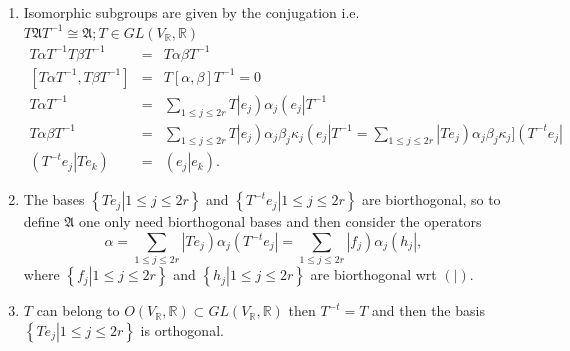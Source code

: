 \documentclass[aps,preprint]{revtex4}
\begin{document}
\begin{enumerate}
\item Isomorphic subgroups are given by the conjugation i.e. $T\mathfrak{A}%
T^{-1}\cong \mathfrak{A;}T\in GL\left( V_{\mathbb{R}},\mathbb{R}\right) $ 
\begin{eqnarray}
T\alpha T^{-1}T\beta T^{-1} &=&T\alpha \beta T^{-1} \\
\left[ T\alpha T^{-1},T\beta T^{-1}\right] &=&T\left[ \alpha ,\beta \right]
T^{-1}=0 \\
T\alpha T^{-1} &=&\sum_{1\leq j\leq 2r}T\left\vert e_{j}\right) \alpha
_{j}\left( e_{j}\right\vert T^{-1} \\
T\alpha \beta T^{-1} &=&\sum_{1\leq j\leq 2r}T\left\vert e_{j}\right) \alpha
_{j}\beta _{j}\kappa _{j}\left( e_{j}\right\vert T^{-1}=\sum_{1\leq j\leq
2r}\left\vert Te_{j}\right) \alpha _{j}\beta _{j}\kappa _{j}]\left(
T^{-t}e_{j}\right\vert \\
\left( \left. T^{-t}e_{j}\right\vert Te_{k}\right) &=&\left( \left.
e_{j}\right\vert e_{k}\right) .
\end{eqnarray}

\item The bases $\left\{ \left. Te_{j}\right\vert 1\leq j\leq 2r\right\} $
and $\left\{ \left. T^{-t}e_{j}\right\vert 1\leq j\leq 2r\right\} $ are
biorthogonal, so to define $\mathfrak{A}$ one only need biorthogonal bases
and then consider the operators 
\begin{equation}
\alpha =\sum_{1\leq j\leq 2r}\left\vert Te_{j}\right) \alpha _{j}\left(
T^{-t}e_{j}\right\vert =\sum_{1\leq j\leq 2r}\left\vert f_{j}\right) \alpha
_{j}\left( h_{j}\right\vert ,
\end{equation}%
where $\left\{ \left. f_{j}\right\vert 1\leq j\leq 2r\right\} $ and $\left\{
\left. h_{j}\right\vert 1\leq j\leq 2r\right\} $ are biorthogonal wrt $%
\left( \left. {}\right\vert \right) .$

\item $T$ can belong to $O\left( V_{\mathbb{R}},\mathbb{R}\right) \subset
GL\left( V_{\mathbb{R}},\mathbb{R}\right) $ then $T^{-t}=T$ and then the
basis $\left\{ \left. Te_{j}\right\vert 1\leq j\leq 2r\right\} $ is
orthogonal.


\end{enumerate}
\end{document}
